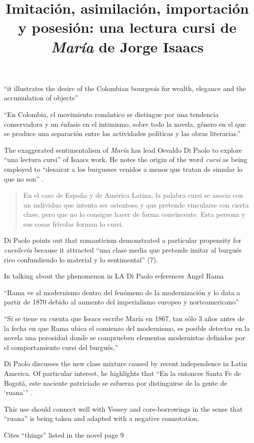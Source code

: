 \documentclass[12pt]{article}
\title{Imitación, asimilación, importación y posesión: una lectura cursi de \textit{María} de Jorge Isaacs}
\makeatletter
\newcommand\iraggedright{%
	\let\\\@centercr\@rightskip\@flushglue \rightskip\@rightskip
	\leftskip\z@skip}
\makeatother
\begin{document}
	\makeheader
	\iraggedright

\enquote{it illustrates the desire of the Colombian bourgeois for wealth, elegance and the accumulation of objects} \cite[6]{Paolo}

\enquote{En	Colombia, el movimiento romántico se distingue por una tendencia conservadora y un énfasis en el intimismo, sobre todo la novela, género en el que se produce una separación entre las actividades políticas y las obras literarias.} \cite[6]{Paolo}

The exaggerated sentimentalism of \textit{María} has lead Osvaldo Di Paolo to explore \enquote{una lectura cursi} of Isaacs work. He notes the origin of the word \textit{cursi} as being employed to \enquote{desairar a los burgueses venidos a menos que tratan de simular lo que no son} \cite[7]{Paolo}. \blockquote{En el caso de España y de América Latina, la palabra cursi se asocia con un individuo que intenta ser ostentoso y que pretende vincularse con cierta clase, pero que no lo consigue hacer de forma convincente. Esta persona y sus cosas frívolas forman lo cursi.} Di Paolo points out that romanticism demonstrated a particular propensity for \textit{cursilería} because it attracted \enquote{una clase media que pretende imitar al burgués rico confundiendo lo material y lo sentimental} (7).

In talking about the phenomenon in LA Di Paolo references Angel Rama

\enquote{Rama ve al modernismo dentro del fenómeno de la modernización y lo data a partir de 1870 debido al aumento del imperialismo europeo y norteamericano} \cite[8]{Paolo} 

\enquote{Si se tiene en cuenta que   Issacs escribe María en 1867, tan sólo 3 años antes de la fecha en que Rama ubica el comienzo del modernismo, es posible detectar en  la  novela  una  porosidad  donde  se  comprueben  elementos modernistas definidos por el comportamiento cursi del burgués,} \cite[8]{Paolo}

Di Paolo discusses the new class mixture caused by recent independence in Latin America. Of particular interest, he highlights that \enquote{En la entonces Santa Fe de Bogotá, este naciente patriciado se esfuerza por distinguirse de la gente de \enquote{ruana}} \cite[8]{Paolo}.

This use should connect well with Vessey and core-borrowings in the sense that \enquote{ruana} is being taken and adapted with a negative connotation.

Cites \enquote{things} listed in the novel page 9
\end{document}
